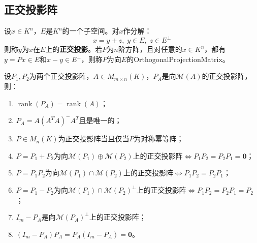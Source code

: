 \subsection{正交投影阵}
\begin{definition}
	设$x\in K^n$，$E$是$K^n$的一个子空间。对$x$作分解：
	\begin{equation*}
		x=y+z,\;y\in E,\;z\in E^\perp
	\end{equation*}
	则称$y$为$x$在$E$上的\textbf{正交投影}。若$P$为$n$阶方阵，且对任意的$x\in K^n$，都有$y=Px\in E$和$x-y\in E^\perp$，则称$P$为向$E$的\gls{OrthogonalProjectionMatrix}。
\end{definition}
\begin{property}\label{prop:OrthogonalProjectionMat}
	设$P_1,P_2$为两个正交投影阵，$A\in M_{m\times n}(K)$，$P_A$是向$\mathcal{M}(A)$的正交投影阵，则：
	\begin{enumerate}
		\item $\operatorname{rank}(P_A)=\operatorname{rank}(A)$；
		\item $P_A=A(A^TA)^-A^T$且是唯一的；
		\item $P\in M_{n}(K)$为正交投影阵当且仅当$P$为对称幂等阵；
		\item $P=P_1+P_2$为向$\mathcal{M}(P_1)\oplus\mathcal{M}(P_2)$上的正交投影阵$\iff P_1P_2=P_2P_1=\mathbf{0}$；
		\item $P=P_1P_2$为向$\mathcal{M}(P_1)\cap\mathcal{M}(P_2)$上的正交投影阵$\iff P_1P_2=P_2P_1$；
		\item $P=P_1-P_2$为向$\mathcal{M}(P_1)\cap\mathcal{M}(P_2)^\perp$上的正交投影阵$\iff P_1P_2=P_2P_1=P_2$；
		\item $I_m-P_A$是向$\mathcal{M}(P_A)^\perp$上的正交投影阵；
		\item $(I_m-P_A)P_A=P_A(I_m-P_A)=\mathbf{0}$。
	\end{enumerate}
\end{property}
